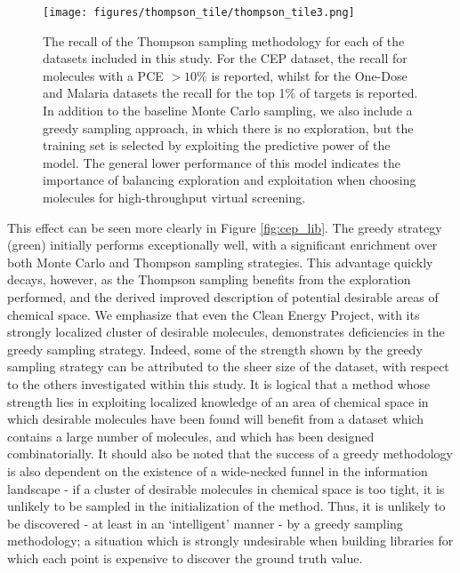 \begin{figure}[htb]
\begin{center}
\texttt{[image: figures/thompson\_tile/thompson\_tile3.png]}
\label{fig:thompson_1pc}
\caption{The recall of the Thompson sampling methodology for each of the datasets included in this study.  For the CEP dataset, the recall for molecules with a PCE $>10\%$ is reported, whilst for the One-Dose and Malaria datasets the recall for the top 1\% of targets is reported.  In addition to the baseline Monte Carlo sampling, we also include a greedy sampling approach, in which there is no exploration, but the training set is selected by exploiting the predictive power of the model.  The general lower performance of this model indicates the importance of balancing exploration and exploitation when choosing molecules for high-throughput virtual screening.}
\end{center}
\end{figure}
This effect can be seen more clearly in Figure \ref{fig:cep_lib}.  The greedy strategy (green) initially performs exceptionally well, with a significant enrichment over both Monte Carlo and Thompson sampling strategies.  This advantage quickly decays, however, as the Thompson sampling benefits from the exploration performed, and the derived improved description of potential desirable areas of chemical space. We emphasize that even the Clean Energy Project, with its strongly localized cluster of desirable molecules, demonstrates deficiencies in the greedy sampling strategy.  Indeed, some of the strength shown by the greedy sampling strategy can be attributed to the sheer size of the dataset, with respect to the others investigated within this study.  It is logical that a method whose strength lies in exploiting localized knowledge of an area of chemical space in which desirable molecules have been found will benefit from a dataset which contains a large number of molecules, and which has been designed combinatorially. It should also be noted that the success of a greedy methodology is also dependent on the existence of a wide-necked funnel in the information landscape - if a cluster of desirable molecules in chemical space is too tight, it is unlikely to be sampled in the initialization of the method.  Thus, it is unlikely to be discovered - at least in an `intelligent' manner - by a greedy sampling methodology; a situation which is strongly undesirable when building libraries for which each point is expensive to discover the ground truth value.
  

